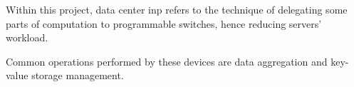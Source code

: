 Within this project, data center \gls{inp} refers to the technique of delegating some parts of computation to programmable switches, hence reducing servers' workload.

Common operations performed by these devices are data aggregation and key-value storage management.


